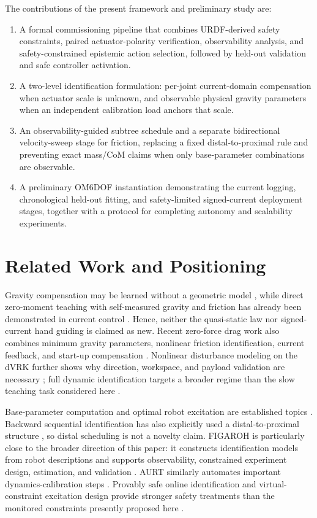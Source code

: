 \documentclass[conference]{IEEEtran}
\begin{document}
The contributions of the present framework and preliminary study are:
\begin{enumerate}
  \item A formal commissioning pipeline that combines URDF-derived safety
  constraints, paired actuator-polarity verification, observability analysis,
  and safety-constrained epistemic action selection, followed by held-out
  validation and safe controller activation.
  \item A two-level identification formulation: per-joint current-domain
  compensation when actuator scale is unknown, and observable physical gravity
  parameters when an independent calibration load anchors that scale.
  \item An observability-guided subtree schedule and a separate bidirectional
  velocity-sweep stage for friction, replacing a fixed distal-to-proximal rule
  and preventing exact mass/CoM claims when only base-parameter combinations
  are observable.
  \item A preliminary OM6DOF instantiation demonstrating the current logging,
  chronological held-out fitting, and safety-limited signed-current deployment
  stages, together with a protocol for completing autonomy and scalability
  experiments.
\end{enumerate}

\section{Related Work and Positioning}
Gravity compensation may be learned without a geometric model \cite{Yu2018},
while direct zero-moment teaching with self-measured gravity and friction has
already been demonstrated in current control \cite{Chen2018,Chen2023}. Hence,
neither the quasi-static law nor signed-current hand guiding is claimed as new.
Recent zero-force drag work also combines minimum gravity parameters, nonlinear
friction identification, current feedback, and start-up compensation
\cite{Li2025ZeroForce}.
Nonlinear disturbance modeling on the dVRK further shows why direction,
workspace, and payload validation are necessary \cite{Lin2019}; full dynamic
identification targets a broader regime than the slow teaching task considered
here \cite{Zhou2026}.

Base-parameter computation and optimal robot excitation are established topics
\cite{Gautier1991Base,Swevers1997Optimal}. Backward sequential identification
has also explicitly used a distal-to-proximal structure \cite{Jung2018Backward},
so distal scheduling is not a novelty claim. FIGAROH is particularly close to
the broader direction of this paper: it constructs identification models from
robot descriptions and supports observability, constrained experiment design,
estimation, and validation \cite{Nguyen2023FIGAROH}. AURT similarly automates
important dynamics-calibration steps \cite{Madsen2022AURT}. Provably safe
online identification and virtual-constraint excitation design provide stronger
safety treatments than the monitored constraints presently proposed here
\cite{Tian2024VirtualConstraints,Zhang2025SafeSysID}.
\end{document}
